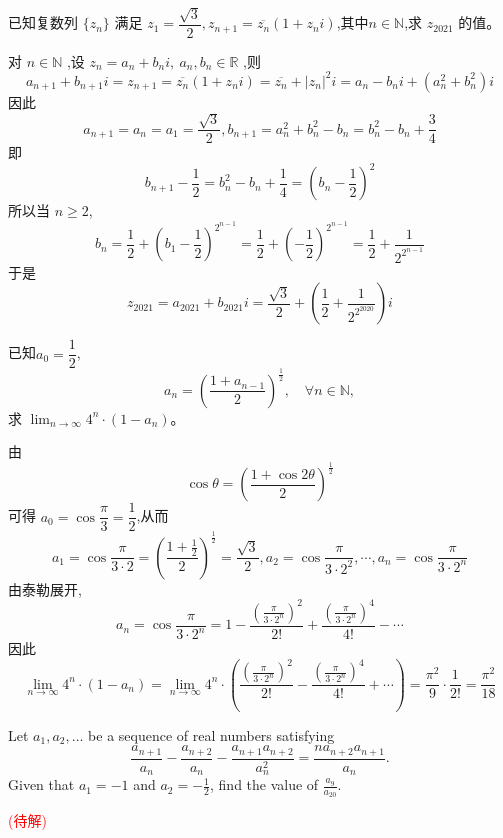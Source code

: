 \begin{questions}
    \question 已知复数列 $\{z_{n}\}$ 满足
        $z_{1}=\dfrac{\sqrt{3}}{2},z_{n+1}=\overline{z_{n}}(1+z_{n}i)$,其中$n\in\mathbb{N}$,求 $z_{2021}$ 的值。
    \begin{solution}
        对 $n\in \mathbb{N}$ ,设 $z_{n}=a_{n}+b_{n}i,\ a_{n},b_{n}\in \mathbb{R}$ ,则
        \[
        a_{n+1}+b_{n+1}i=z_{n+1}=\overline{z_{n}}(1+z_{n}i)=\overline{z_{n}}+|z_{n}|^{2}i=a_{n}-b_{n}i+(a_{n}^{2}+b_{n}^{2})i
        \]
        因此 
        \[
        a_{n+1}=a_{n}=a_1=\frac{\sqrt{3}}{2}, b_{n+1}=a_{n}^{2}+b_{n}^{2}-b_{n}=b_{n}^{2}-b_{n}+\frac{3}{4}
        \]
        即 
        \[
        b_{n+1}-\frac{1}{2}=b_{n}^{2}-b_{n}+\frac{1}{4}=(b_{n}-\frac{1}{2})^{2}\]
        所以当 $n\ge2$,
        \[
        b_{n}=\frac{1}{2}+(b_{1}-\frac{1}{2})^{2^{n-1}}=\frac{1}{2}+(-\frac{1}{2})^{2^{n-1}}=\frac{1}{2}+\frac{1}{2^{2^{n-1}}}
        \]
        于是
        \[
        z_{2021}=a_{2021}+b_{2021}i=\frac{\sqrt{3}}{2}+(\frac{1}{2}+\frac{1}{2^{2^{2020}}})i
        \]
    \end{solution}

    \question 已知$a_0 = \dfrac{1}{2}$,
    \[
    a_n = \left(\frac{1 + a_{n-1}}{2}\right)^{\frac{1}{2}},\quad \forall n \in \mathbb{N},
    \]
    求 $\displaystyle \lim_{n \rightarrow \infty} 4^n \cdot (1 - a_n)$。
    \begin{solution}
        由
        \[
        \cos \theta = \left(\frac{1 + \cos 2\theta}{2}\right)^{\frac{1}{2}}
        \]
        可得 $a_0 = \cos \dfrac{\pi}{3} = \dfrac{1}{2}$,从而
        \[
        a_1 = \cos \frac{\pi}{3 \cdot 2} = \left(\frac{1 + \frac{1}{2}}{2}\right)^{\frac{1}{2}} = \frac{\sqrt{3}}{2},  a_2 = \cos \frac{\pi}{3 \cdot 2^2}, \cdots,  a_n = \cos \frac{\pi}{3 \cdot 2^n}
        \]
        由泰勒展开,
        \[
        a_n = \cos \frac{\pi}{3 \cdot 2^n} = 1 - \frac{\left(\frac{\pi}{3 \cdot 2^n}\right)^2}{2!} + \frac{\left(\frac{\pi}{3 \cdot 2^n}\right)^4}{4!} - \cdots
        \]
        因此
        \[
        \lim_{n \to \infty} 4^n \cdot (1 - a_n)
        = \lim_{n \to \infty} 4^n \cdot \left( \frac{\left(\frac{\pi}{3 \cdot 2^n}\right)^2}{2!} - \frac{\left(\frac{\pi}{3 \cdot 2^n}\right)^4}{4!} + \cdots \right)
        = \frac{\pi^2}{9} \cdot \frac{1}{2!}
        = \frac{\pi^2}{18}
        \]
    \end{solution}
    
    \question Let $a_1,a_2,\dots$ be a sequence of real numbers satisfying
$$\frac{a_{n+1}}{a_n}-\frac{a_{n+2}}{a_n}-\frac{a_{n+1}a_{n+2}}{a_n^2}=\frac{na_{n+2}a_{n+1}}{a_n}.$$Given that $a_1=-1$ and $a_2=-\tfrac{1}{2}$, find the value of $\tfrac{a_9}{a_{20}}$.
    \begin{solution}
        \textcolor{red}{(待解)}
    \end{solution}


\end{questions}
